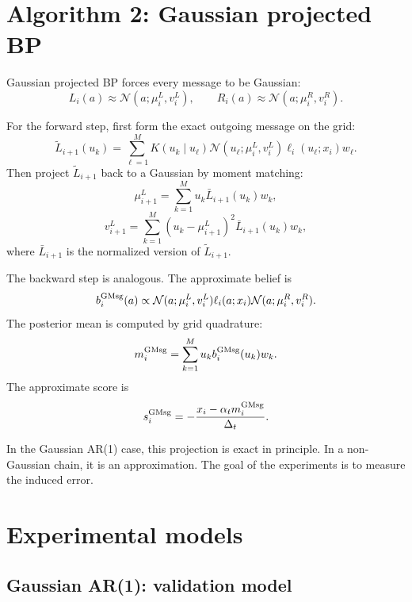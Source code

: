 \documentclass[11pt]{article}
\newcommand{\Normal}{\mathcal{N}}
\begin{document}
\section{Algorithm 2: Gaussian projected BP}

Gaussian projected BP forces every message to be Gaussian:
\begin{equation}
  L_i(a)\approx \Normal(a;\mu_i^L,v_i^L),
  \qquad
  R_i(a)\approx \Normal(a;\mu_i^R,v_i^R).
\end{equation}

For the forward step, first form the exact outgoing message on the grid:
\begin{equation}
  \widetilde L_{i+1}(u_k)
  =
  \sum_{\ell=1}^M K(u_k\mid u_\ell)
  \Normal(u_\ell;\mu_i^L,v_i^L)
  \ell_i(u_\ell;x_i)w_\ell.
\end{equation}
Then project \(\widetilde L_{i+1}\) back to a Gaussian by moment matching:
\begin{equation}
  \mu_{i+1}^L
  = \sum_{k=1}^M u_k\bar L_{i+1}(u_k)w_k,
\end{equation}
\begin{equation}
  v_{i+1}^L
  = \sum_{k=1}^M (u_k-\mu_{i+1}^L)^2\bar L_{i+1}(u_k)w_k,
\end{equation}
where \(\bar L_{i+1}\) is the normalized version of \(\widetilde L_{i+1}\).

The backward step is analogous. The approximate belief is
\begin{equation}
  b_i^{\rm GMsg}(a)
  \propto
  \Normal(a;\mu_i^L,v_i^L)\ell_i(a;x_i)\Normal(a;\mu_i^R,v_i^R).
\end{equation}
The posterior mean is computed by grid quadrature:
\begin{equation}
  m_i^{\rm GMsg}
  = \sum_{k=1}^M u_k b_i^{\rm GMsg}(u_k)w_k.
\end{equation}
The approximate score is
\begin{equation}
  s_i^{\rm GMsg}
  = -\frac{x_i-\alpha_t m_i^{\rm GMsg}}{\Delta_t}.
\end{equation}

In the Gaussian AR(1) case, this projection is exact in principle. In a non-Gaussian chain, it is an approximation. The goal of the experiments is to measure the induced error.

\section{Experimental models}

\subsection{Gaussian AR(1): validation model}
\end{document}
